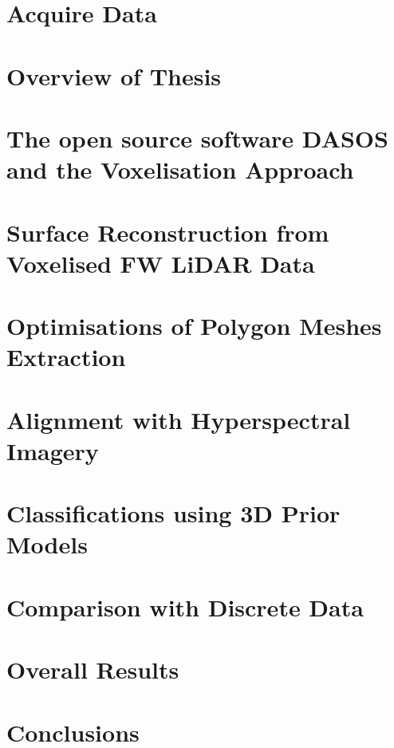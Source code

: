 \documentclass[11pt,nofootinbib]{report}
\begin{document}
    \chapter{Acquire Data}\label{AcquireData}
	    
	    \newpage
	\chapter{Overview of Thesis}\label{PipeLine}
		

	\chapter{The open source software DASOS and the Voxelisation Approach}\label{DASOS_Voxelisation}
	  		
	\newpage


		 		
	\chapter{Surface Reconstruction from Voxelised FW LiDAR Data}\label{Visualisations}
		
		\newpage
    \chapter{Optimisations of Polygon Meshes Extraction}\label{Optimisations}
			 
			 \newpage
	\chapter{Alignment with Hyperspectral Imagery}\label{Alignment}
		
		\newpage		
	\chapter{Classifications using 3D Prior Models}\label{Classifications}
		
		\newpage
	\chapter{Comparison with Discrete Data}\label{ComparisonDiscreteVsFW}
	    
	    \newpage
	\chapter{Overall Results}\label{Results}
		
		\newpage
	\chapter{Conclusions}\label{Conclusions}
		
		\newpage
\end{document}
